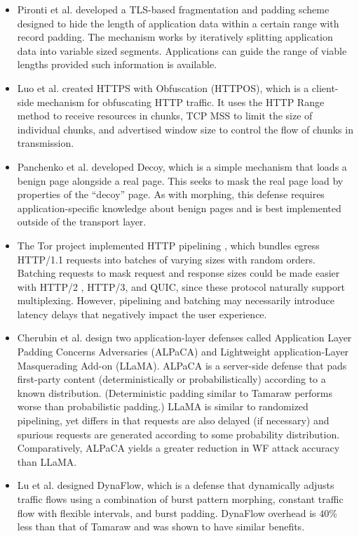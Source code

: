 \documentclass[runningheads]{llncs}
\begin{document}
\begin{itemize}
\item Pironti et al. \cite{pironti2012identifying} developed a TLS-based fragmentation and padding
scheme designed to hide the length of application data within a certain range with record padding.
The mechanism works by iteratively splitting application data into variable sized segments. Applications
can guide the range of viable lengths provided such information is available.

\item Luo et al. \cite{luo2011httpos} created HTTPS with Obfuscation (HTTPOS), which is a client-side
mechanism for obfuscating HTTP traffic. It uses the HTTP Range method to receive resources in chunks, TCP
MSS to limit the size of individual chunks, and advertised window size to control the flow of chunks
in transmission.

\item Panchenko et al. \cite{panchenko2011website} developed Decoy, which is a simple mechanism that loads
a benign page alongside a real page. This seeks to mask the real page load by properties of the ``decoy'' page.
As with morphing, this defense requires application-specific knowledge about benign pages and is best
implemented outside of the transport layer.

\item The Tor project implemented HTTP pipelining \cite{perry2011experimental}, which bundles egress HTTP/1.1
requests into batches of varying sizes with random orders. Batching requests to mask request and response sizes
could be made easier with HTTP/2 \cite{rfc7540}, HTTP/3, and QUIC, since these protocol naturally support
multiplexing. However, pipelining and batching may necessarily introduce latency delays that negatively impact
the user experience.

\item Cherubin et al. \cite{cherubin2017website} design two application-layer defenses called Application
Layer Padding Concerns Adversaries (ALPaCA) and Lightweight application-Layer Masquerading Add-on (LLaMA).
ALPaCA is a server-side defense that pads first-party content (deterministically or probabilistically)
according to a known distribution. (Deterministic padding similar to Tamaraw performs worse than
probabilistic padding.) LLaMA is similar to randomized pipelining, yet differs in that requests are also
delayed (if necessary) and spurious requests are generated according to some probability distribution.
Comparatively, ALPaCA yields a greater reduction in WF attack accuracy than LLaMA.

\item Lu et al. \cite{lu2018dynaflow} designed DynaFlow, which is a defense that dynamically adjusts
traffic flows using a combination of burst pattern morphing, constant traffic flow with flexible
intervals, and burst padding. DynaFlow overhead is $40$\% less than that of Tamaraw and was shown
to have similar benefits.

\end{itemize}
%
\end{document}
